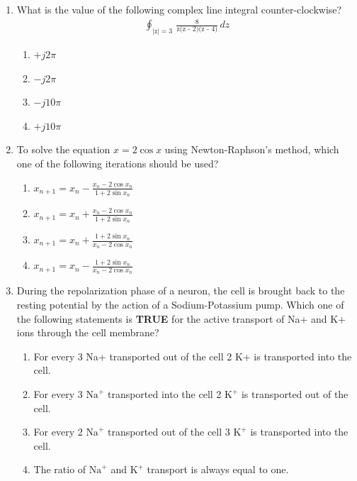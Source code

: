 \documentclass[a4paper,12pt]{exam}
\numberwithin{equation}{enumi}
\numberwithin{figure}{enumi}
\begin{document}
\begin{enumerate}
\item What is the value of the following complex line integral counter-clockwise? \\
\begin{align*}
\displaystyle\oint_{|\text{z}| = 3} \,\frac{8}{\text{z(z - 2)(z - 4)}} \, dz
\end{align*}

\hfill{}

\begin{multicols}{4}
\begin{enumerate}
 \item $+j2\pi$
\item $-j2\pi$
\item $-j10\pi$
\item $+j10\pi$
\end{enumerate}  
\end{multicols}


\item To solve the equation $x = 2 \cos x$ using Newton-Raphson's method, which one of the following iterations should be used? 

\hfill{}

\begin{enumerate}
\item  $x_{n+1} = x_n - \frac{x_n - 2\cos x_n}{1 + 2\sin x_n}$
\vspace{0.5cm}
\item  $x_{n+1} = x_n + \frac{x_n - 2\cos x_n}{1 + 2\sin x_n}$
\vspace{0.5cm}
\item  $x_{n+1} = x_n + \frac{1 + 2\sin x_n}{x_n - 2\cos x_n}$
\vspace{0.5cm}
\item  $x_{n+1} = x_n - \frac{1 + 2\sin x_n}{x_n - 2\cos x_n}$
\end{enumerate}  

\vspace{0.25cm}

\item During the repolarization phase of a neuron, the cell is brought back to the resting potential by the action of a Sodium-Potassium pump. Which one of the following  statements is \textbf{TRUE} for the active transport of Na+ and K+ ions through the cell membrane?

\hfill{}

\begin{enumerate}
 \item For every 3 Na+ transported out of the cell 2 K+ is transported into the cell.
\item For every 3 $\text{Na}^+$ transported into the cell 2 $\text{K}^+$ is transported out of the cell.
\item For every 2 $\text{Na}^+$ transported out of the cell 3 $\text{K}^+$ is transported into the cell. 
\item The ratio of $\text{Na}^+$ and $\text{K}^+$ transport is always equal to one.
\end{enumerate}  


\end{enumerate}
\end{document}
